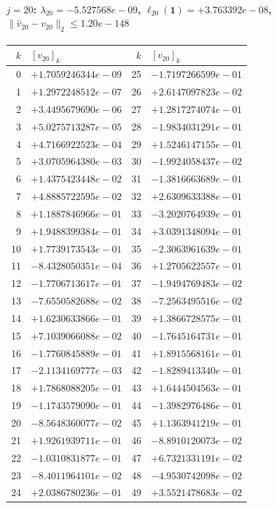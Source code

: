 \documentclass[11pt]{article}
\begin{document}
\paragraph{$j = 20$: $\lambda_{20} = -5.527568e-09$, \quad $\ell_{20}(\mathbf{1}) = +3.763392e-08$, \quad $\|\hat{v}_{20} - v_{20}\|_2 \leq 1.20e-148$}
\begin{center}
{\footnotesize
\begin{tabular}{r@{\;\;}l@{\quad}r@{\;\;}l}
\toprule
$k$ & $[v_{20}]_k$ & $k$ & $[v_{20}]_k$ \\
\midrule
0 & $+1.7059246344e-09$ & 25 & $-1.7197266599e-01$ \\
1 & $+1.2972248512e-07$ & 26 & $+2.6147097823e-02$ \\
2 & $+3.4495679690e-06$ & 27 & $+1.2817274074e-01$ \\
3 & $+5.0275713287e-05$ & 28 & $-1.9834031291e-01$ \\
4 & $+4.7166922523e-04$ & 29 & $+1.5246147155e-01$ \\
5 & $+3.0705964380e-03$ & 30 & $-1.9924058437e-02$ \\
6 & $+1.4375423448e-02$ & 31 & $-1.3816663689e-01$ \\
7 & $+4.8885722595e-02$ & 32 & $+2.6309633388e-01$ \\
8 & $+1.1887846966e-01$ & 33 & $-3.2020764939e-01$ \\
9 & $+1.9488399384e-01$ & 34 & $+3.0391348094e-01$ \\
10 & $+1.7739173543e-01$ & 35 & $-2.3063961639e-01$ \\
11 & $-8.4328050351e-04$ & 36 & $+1.2705622557e-01$ \\
12 & $-1.7706713617e-01$ & 37 & $-1.9494769483e-02$ \\
13 & $-7.6550582688e-02$ & 38 & $-7.2563495516e-02$ \\
14 & $+1.6230633866e-01$ & 39 & $+1.3866728575e-01$ \\
15 & $+7.1039066088e-02$ & 40 & $-1.7645164731e-01$ \\
16 & $-1.7760845889e-01$ & 41 & $+1.8915568161e-01$ \\
17 & $-2.1134169777e-03$ & 42 & $-1.8289413340e-01$ \\
18 & $+1.7868088205e-01$ & 43 & $+1.6444504563e-01$ \\
19 & $-1.1743579090e-01$ & 44 & $-1.3982976486e-01$ \\
20 & $-8.5648360077e-02$ & 45 & $+1.1363941219e-01$ \\
21 & $+1.9261939711e-01$ & 46 & $-8.8910120073e-02$ \\
22 & $-1.0310831877e-01$ & 47 & $+6.7321331191e-02$ \\
23 & $-8.4011964101e-02$ & 48 & $-4.9530742098e-02$ \\
24 & $+2.0386780236e-01$ & 49 & $+3.5521478683e-02$ \\
\bottomrule
\end{tabular}
}
\end{center}
\end{document}
